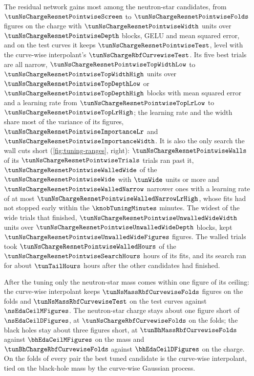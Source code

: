 The residual network gains most among the neutron-star candidates, from $\tunNsChargeResnetPointwiseScreen$ to $\tunNsChargeResnetPointwiseFolds$ figures on the charge with $\tunNsChargeResnetPointwiseWidth$ units over $\tunNsChargeResnetPointwiseDepth$ blocks, GELU and mean squared error, and on the test curves it keeps $\tunNsChargeResnetPointwiseTest$, level with the curve-wise interpolant's $\tunNsChargeRbfCurvewiseTest$. Its five best trials are all narrow, $\tunNsChargeResnetPointwiseTopWidthLow$ to $\tunNsChargeResnetPointwiseTopWidthHigh$ units over $\tunNsChargeResnetPointwiseTopDepthLow$ or $\tunNsChargeResnetPointwiseTopDepthHigh$ blocks with mean squared error and a learning rate from $\tunNsChargeResnetPointwiseTopLrLow$ to $\tunNsChargeResnetPointwiseTopLrHigh$; the learning rate and the width share most of the variance of its figures, $\tunNsChargeResnetPointwiseImportanceLr$ and $\tunNsChargeResnetPointwiseImportanceWidth$. It is also the only search the wall cuts short (\cref{fig:tuning-ranges}, right): $\tunNsChargeResnetPointwiseWalls$ of its $\tunNsChargeResnetPointwiseTrials$ trials ran past it, $\tunNsChargeResnetPointwiseWalledWide$ of the $\tunNsChargeResnetPointwiseWide$ with $\tunWide$ units or more and $\tunNsChargeResnetPointwiseWalledNarrow$ narrower ones with a learning rate of at most $\tunNsChargeResnetPointwiseWalledNarrowLrHigh$, whose fits had not stopped early within the $\knobTuningMinutes$ minutes. The widest of the wide trials that finished, $\tunNsChargeResnetPointwiseUnwalledWideWidth$ units over $\tunNsChargeResnetPointwiseUnwalledWideDepth$ blocks, kept $\tunNsChargeResnetPointwiseUnwalledWideFigures$ figures. The walled trials took $\tunNsChargeResnetPointwiseWalledHours$ of the $\tunNsChargeResnetPointwiseSearchHours$ hours of its fits, and its search ran for about $\tunTailHours$ hours after the other candidates had finished.

After the tuning only the neutron-star mass comes within one figure of its ceiling: the curve-wise interpolant keeps $\tunNsMassRbfCurvewiseFolds$ figures on the folds and $\tunNsMassRbfCurvewiseTest$ on the test curves against $\nsEdaCeilMFigures$. The neutron-star charge stays about one figure short of $\nsEdaCeilDFigures$, at $\tunNsChargeRbfCurvewiseFolds$ on the folds; the black holes stay about three figures short, at $\tunBhMassRbfCurvewiseFolds$ against $\bhEdaCeilMFigures$ on the mass and $\tunBhChargeRbfCurvewiseFolds$ against $\bhEdaCeilDFigures$ on the charge. On the folds of every pair the best tuned candidate is the curve-wise interpolant, tied on the black-hole mass by the curve-wise Gaussian process.

